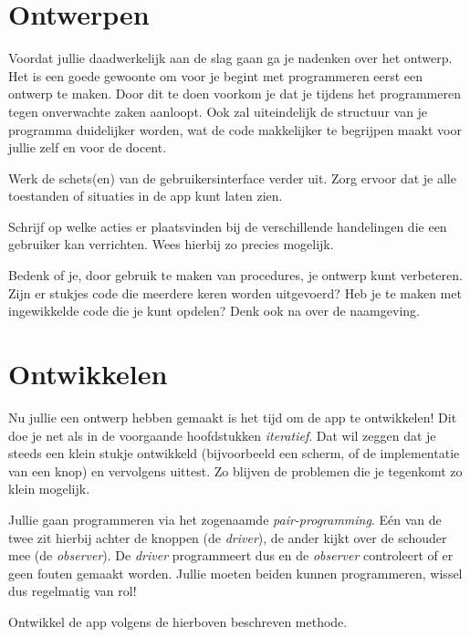 \section{Ontwerpen}
Voordat jullie daadwerkelijk aan de slag gaan ga je nadenken over het ontwerp. Het is een goede gewoonte om voor je begint met programmeren eerst een ontwerp te maken. Door dit te doen voorkom je dat je tijdens het programmeren tegen onverwachte zaken aanloopt. Ook zal uiteindelijk de structuur van je programma duidelijker worden, wat de code makkelijker te begrijpen maakt voor jullie zelf en voor de docent.

\begin{opgave}
	\opgVraag
	Werk de schets(en) van de gebruikersinterface verder uit. Zorg ervoor dat je alle toestanden of situaties in de app kunt laten zien.
\end{opgave}

\begin{opgave}
	\opgVraag
	Schrijf op welke acties er plaatsvinden bij de verschillende handelingen die een gebruiker kan verrichten. Wees hierbij zo precies mogelijk.
\end{opgave}

\begin{opgave}
	\opgVraag
	Bedenk of je, door gebruik te maken van procedures, je ontwerp kunt verbeteren. Zijn er stukjes code die meerdere keren worden uitgevoerd? Heb je te maken met ingewikkelde code die je kunt opdelen? Denk ook na over de naamgeving.
\end{opgave}

\section{Ontwikkelen}
Nu jullie een ontwerp hebben gemaakt is het tijd om de app te ontwikkelen! Dit doe je net als in de voorgaande hoofdstukken \emph{iteratief}. Dat wil zeggen dat je steeds een klein stukje ontwikkeld (bijvoorbeeld een scherm, of de implementatie van een knop) en vervolgens uittest. Zo blijven de problemen die je tegenkomt zo klein mogelijk. 

Jullie gaan programmeren via het zogenaamde \emph{pair-programming}. E\'en van de twee zit hierbij achter de knoppen (de \emph{driver}), de ander kijkt over de schouder mee (de \emph{observer}). De \emph{driver} programmeert dus en de \emph{observer} controleert of er geen fouten gemaakt worden. Jullie moeten beiden kunnen programmeren, wissel dus regelmatig van rol!

\begin{opgave}
	\opgVraag
	Ontwikkel de app volgens de hierboven beschreven methode.
\end{opgave}

